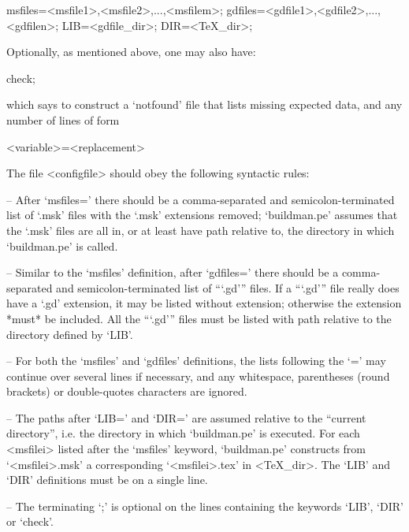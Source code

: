 msfiles=<msfile1>,<msfile2>,...,<msfilem>;
gdfiles=<gdfile1>,<gdfile2>,...,<gdfilen>;
LIB=<gdfile_dir>;
DIR=<TeX_dir>;

Optionally, as mentioned above, one may also have:

check;

which says to construct a `notfound' file  that  lists  missing  expected
data, and any number of lines of form

<variable>=<replacement>

\goodbreak%
The file <configfile> should obey the following syntactic rules:

\beginlist%

\item{--}
After   `msfiles='   there    should    be    a    comma-separated    and
semicolon-terminated list of `.msk'  files  with  the  `.msk'  extensions
removed; `buildman.pe' assumes that the `.msk' files are all  in,  or  at
least have path relative to, the  directory  in  which  `buildman.pe'  is
called.

\item{--}
Similar to the `msfiles' definition, after `gdfiles=' there should  be  a
comma-separated and semicolon-terminated list of ```.gd'''  files.  If  a
```.gd''' file really does have a  `.gd'  extension,  it  may  be  listed
without extension; otherwise the extension *must* be  included.  All  the
```.gd''' files must be  listed  with  path  relative  to  the  directory
defined by `LIB'.

\item{--}
For both the `msfiles' and `gdfiles' definitions, the lists following the
`=' may continue over several lines if  necessary,  and  any  whitespace,
parentheses (round brackets) or double-quotes characters are ignored.

\item{--}
The paths after `LIB=' and `DIR=' are assumed relative to  the  ``current
directory'', i.e. the directory in which `buildman.pe' is  executed.  For
each  <msfilei>  listed  after  the  `msfiles'   keyword,   `buildman.pe'
constructs  from  `<msfilei>.msk'  a  corresponding  `<msfilei>.tex'   in
<TeX_dir>. The `LIB' and `DIR' definitions must be on a single line.

\item{--}
The terminating `;' is optional on  the  lines  containing  the  keywords
`LIB', `DIR' or `check'.

